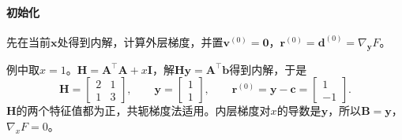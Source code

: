 \paragraph{初始化}
先在当前$\bm{x}$处得到内解，计算外层梯度，并置$\bm{v}^{(0)}=\bm{0}$，$\bm{r}^{(0)}=\bm{d}^{(0)}=\nabla_{\bm{y}}F$。

例中取$x=1$。$\bm{H}=\bm{A}^{\top}\bm{A}+x\bm{I}$，解$\bm{H}\bm{y}=\bm{A}^{\top}\bm{b}$得到内解，于是
\[
 \bm{H}=\begin{bmatrix}2&1\\1&3\end{bmatrix},\qquad
 \bm{y}=\begin{bmatrix}1\\1\end{bmatrix},\qquad
 \bm{r}^{(0)}=\bm{y}-\bm{c}=\begin{bmatrix}1\\-1\end{bmatrix}.
\]
$\bm{H}$的两个特征值都为正，共轭梯度法适用。内层梯度对$x$的导数是$\bm{y}$，所以$\bm{B}=\bm{y}$，$\nabla_xF=0$。

